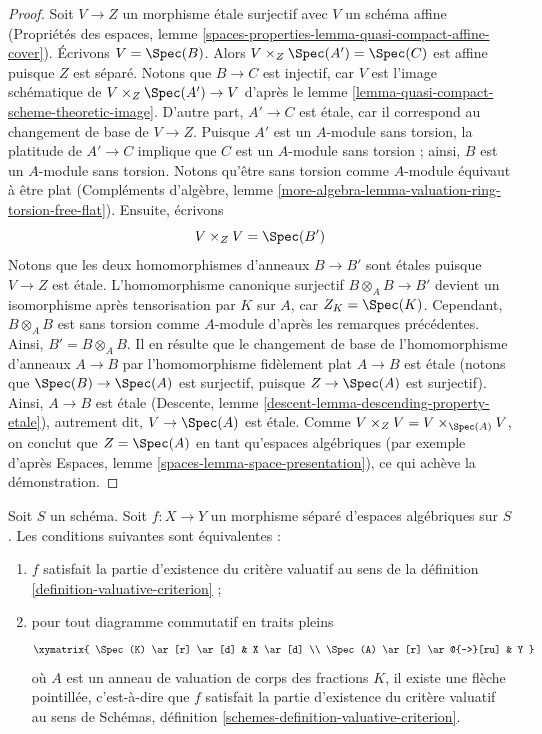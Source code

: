 \begin{proof}
\medskip\noindent
Soit $V \to Z$ un morphisme étale surjectif avec $V$ un
schéma affine (Propriétés des espaces, lemme
\ref{spaces-properties-lemma-quasi-compact-affine-cover}).
Écrivons $V = \Spec(B)$. Alors $V \times_Z \Spec(A') = \Spec(C)$
est affine puisque $Z$ est séparé. Notons que $B \to C$ est injectif,
car $V$ est l'image schématique de $V \times_Z \Spec(A') \to V$
d'après le lemme \ref{lemma-quasi-compact-scheme-theoretic-image}.
D'autre part, $A' \to C$ est étale, car il correspond
au changement de base de $V \to Z$.
Puisque $A'$ est un $A$-module sans torsion,
la platitude de $A' \to C$ implique que $C$ est un
$A$-module sans torsion ; ainsi, $B$ est un $A$-module sans torsion.
Notons qu'être sans torsion comme $A$-module équivaut
à être plat (Compléments d'algèbre, lemme
\ref{more-algebra-lemma-valuation-ring-torsion-free-flat}).
Ensuite, écrivons
$$
V \times_Z V = \Spec(B')
$$
Notons que les deux homomorphismes d'anneaux $B \to B'$ sont étales puisque $V \to Z$
est étale. L'homomorphisme canonique surjectif $B \otimes_A B \to B'$
devient un isomorphisme après tensorisation par $K$ sur $A$,
car $Z_K = \Spec(K)$. Cependant, $B \otimes_A B$ est sans torsion
comme $A$-module d'après les remarques précédentes. Ainsi, $B' = B \otimes_A B$.
Il en résulte que le changement de base de l'homomorphisme d'anneaux
$A \to B$ par l'homomorphisme fidèlement plat $A \to B$
est étale (notons que $\Spec(B) \to \Spec(A)$ est surjectif,
puisque $Z \to \Spec(A)$ est surjectif). Ainsi, $A \to B$ est
étale (Descente, lemme \ref{descent-lemma-descending-property-etale}),
autrement dit, $V \to \Spec(A)$ est étale.
Comme $V \times_Z V = V \times_{\Spec(A)} V$,
on conclut que $Z = \Spec(A)$ en tant qu'espaces algébriques
(par exemple d'après Espaces, lemme \ref{spaces-lemma-space-presentation}),
ce qui achève la démonstration.
\end{proof}

\begin{lemma}
\label{lemma-usual-enough}
Soit $S$ un schéma. Soit $f : X \to Y$ un morphisme séparé d'espaces
algébriques sur $S$. Les conditions suivantes sont équivalentes :
\begin{enumerate}
\item $f$ satisfait la partie d'existence du critère valuatif
au sens de la définition \ref{definition-valuative-criterion} ;
\item pour tout diagramme commutatif en traits pleins
$$
\xymatrix{
\Spec(K) \ar[r] \ar[d] & X \ar[d] \\
\Spec(A) \ar[r] \ar@{-->}[ru] & Y
}
$$
où $A$ est un anneau de valuation de corps des fractions $K$, il existe
une flèche pointillée, c'est-à-dire que $f$ satisfait la partie d'existence du critère
valuatif au sens de
Schémas, définition \ref{schemes-definition-valuative-criterion}.
\end{enumerate}
\end{lemma}


